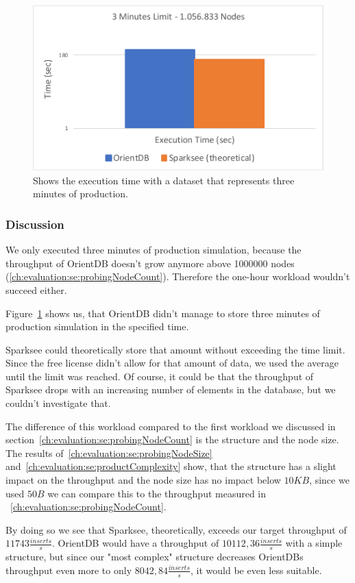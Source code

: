 \begin{figure}[h!]
  \centering
  \includegraphics[width=.75\textwidth]{images/production/singleSuitability}
  \caption{Shows the execution time with a dataset that represents three minutes of production.}
  \label{fig:singleSuitability}
\end{figure}

\subsubsection{Discussion}
\label{ch:evaluation:se:suitabilityDiscussion}
We only executed three minutes of production simulation,
because the throughput of OrientDB doesn't grow anymore above 1000000 nodes (\ref{ch:evaluation:se:probingNodeCount}).
Therefore the one-hour workload wouldn't succeed either.

Figure~\ref{fig:singleSuitability} shows us,
that OrientDB didn't manage to store three minutes of production simulation in the specified time.

Sparksee could theoretically store that amount without exceeding the time limit.
Since the free license didn't allow for that amount of data,
we used the average until the limit was reached.
Of course,
it could be that the throughput of Sparksee drops with an increasing number of elements in the database,
but we couldn't investigate that.

The difference of this workload compared to the first workload we discussed in section~\ref{ch:evaluation:se:probingNodeCount} is the structure and the node size.
The results of~\ref{ch:evaluation:se:probingNodeSize} and~\ref{ch:evaluation:se:productComplexity} show,
that the structure has a slight impact on the throughput and the node size has no impact below $ 10KB $,
since we used $ 50B $ we can compare this to the throughput measured in ~\ref{ch:evaluation:se:probingNodeCount}.

By doing so we see that Sparksee,
theoretically,
exceeds our target throughput of $ 11743 \frac{inserts}{s} $.
OrientDB would have a throughput of $ 10112,36 \frac{inserts}{s} $ with a simple structure,
but since our "most complex" structure decreases OrientDBs throughput even more to only $ 8042,84 \frac{inserts}{s} $,
it would be even less suitable.

